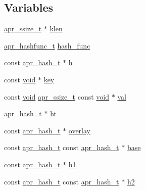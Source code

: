\subsection*{Variables}
\begin{DoxyCompactItemize}
\item 
\hyperlink{group__apr__platform_ga215ebb88932bee220b766263ebbfe6fa}{apr\+\_\+ssize\+\_\+t} $\ast$ \hyperlink{group__apr__hash_ga339e1f6a04084df15b0761bf599c5ca7}{klen}
\item 
\hyperlink{group__apr__hash_ga0bf5622266af13a2489c907a101cb156}{apr\+\_\+hashfunc\+\_\+t} \hyperlink{group__apr__hash_ga8ced7fc7b842146c08d741dfd8443457}{hash\+\_\+func}
\item 
const \hyperlink{structapr__hash__t}{apr\+\_\+hash\+\_\+t} $\ast$ \hyperlink{group__apr__hash_ga0d6dcb41ca5e794b318df5f6fd273ee2}{h}
\item 
const \hyperlink{group__MOD__ISAPI_gacd6cdbf73df3d9eed42fa493d9b621a6}{void} $\ast$ \hyperlink{group__apr__hash_ga267123efa03ff8a912317c0ffc696ad3}{key}
\item 
const \hyperlink{group__MOD__ISAPI_gacd6cdbf73df3d9eed42fa493d9b621a6}{void} \hyperlink{group__apr__platform_ga215ebb88932bee220b766263ebbfe6fa}{apr\+\_\+ssize\+\_\+t} const \hyperlink{group__MOD__ISAPI_gacd6cdbf73df3d9eed42fa493d9b621a6}{void} $\ast$ \hyperlink{group__apr__hash_ga8aad8b01b548ae4e4ac88add980301c5}{val}
\item 
\hyperlink{structapr__hash__t}{apr\+\_\+hash\+\_\+t} $\ast$ \hyperlink{group__apr__hash_ga18cf3e4c61221aa79a41989befa7839f}{ht}
\item 
const \hyperlink{structapr__hash__t}{apr\+\_\+hash\+\_\+t} $\ast$ \hyperlink{group__apr__hash_gaa3a72034880df90e026ac7f9d71e3679}{overlay}
\item 
const \hyperlink{structapr__hash__t}{apr\+\_\+hash\+\_\+t} const \hyperlink{structapr__hash__t}{apr\+\_\+hash\+\_\+t} $\ast$ \hyperlink{group__apr__hash_gafa82ca6541ba85d1a5a2dc882572b309}{base}
\item 
const \hyperlink{structapr__hash__t}{apr\+\_\+hash\+\_\+t} $\ast$ \hyperlink{group__apr__hash_ga7424aa17231f37fcf2350b861ca9b549}{h1}
\item 
const \hyperlink{structapr__hash__t}{apr\+\_\+hash\+\_\+t} const \hyperlink{structapr__hash__t}{apr\+\_\+hash\+\_\+t} $\ast$ \hyperlink{group__apr__hash_gaebeb34ebcc8806faa82df3123f4423cf}{h2}
\item 

\end{DoxyCompactItemize}
